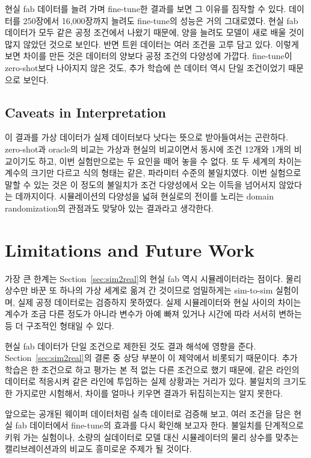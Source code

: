 \documentclass[10pt,twocolumn,a4paper]{article}
\begin{document}
현실 fab 데이터를 늘려 가며 fine-tune한 결과를 보면 그 이유를 짐작할 수 있다. 데이터를
250장에서 16,000장까지 늘려도 fine-tune의 성능은 거의 그대로였다. 현실 fab 데이터가 모두 같은
공정 조건에서 나왔기 때문에, 양을 늘려도 모델이 새로 배울 것이 많지 않았던 것으로 보인다.
반면 트윈 데이터는 여러 조건을 고루 담고 있다. 이렇게 보면 차이를 만든 것은 데이터의 양보다
공정 조건의 다양성에 가깝다. fine-tune이 zero-shot보다 나아지지 않은 것도,
추가 학습에 쓴 데이터 역시 단일 조건이었기 때문으로 보인다.

\subsection{Caveats in Interpretation}

이 결과를 가상 데이터가 실제 데이터보다 낫다는 뜻으로 받아들여서는 곤란하다. zero-shot과
oracle의 비교는 가상과 현실의 비교이면서 동시에 조건 12개와 1개의 비교이기도 하고, 이번
실험만으로는 두 요인을 떼어 놓을 수 없다. 또 두 세계의 차이는 계수의 크기만 다르고 식의
형태는 같은, 파라미터 수준의 불일치였다. 이번 실험으로 말할 수 있는 것은 이 정도의
불일치가 조건 다양성에서 오는 이득을 넘어서지 않았다는 데까지이다. 시뮬레이션의 다양성을
넓혀 현실로의 전이를 노리는 domain randomization\cite{tobin}의 관점과도 맞닿아 있는
결과라고 생각한다.

\section{Limitations and Future Work}

가장 큰 한계는 Section~\ref{sec:sim2real}의 현실 fab 역시 시뮬레이터라는 점이다. 물리 상수만 바꾼 또 하나의 가상
세계로 옮겨 간 것이므로 엄밀하게는 sim-to-sim 실험이며, 실제 공정 데이터로는 검증하지
못하였다. 실제 시뮬레이터와 현실 사이의 차이는 계수가 조금 다른 정도가 아니라 변수가 아예
빠져 있거나 시간에 따라 서서히 변하는 등 더 구조적인 형태일 수 있다.

현실 fab 데이터가 단일 조건으로 제한된 것도 결과 해석에 영향을 준다. Section~\ref{sec:sim2real}의 결론 중 상당 부분이 이 제약에서 비롯되기 때문이다. 추가 학습은 한 조건으로
하고 평가는 본 적 없는 다른 조건으로 했기 때문에, 같은 라인의 데이터로 적응시켜 같은 라인에
투입하는 실제 상황과는 거리가 있다. 불일치의 크기도 한 가지로만 시험해서, 차이를 얼마나
키우면 결과가 뒤집히는지는 알지 못한다.

앞으로는 공개된 웨이퍼 데이터처럼 실측 데이터로 검증해 보고, 여러 조건을 담은 현실 fab
데이터에서 fine-tune의 효과를 다시 확인해 보고자 한다. 불일치를 단계적으로 키워 가는 실험이나,
소량의 실데이터로 모델 대신 시뮬레이터의 물리 상수를 맞추는 캘리브레이션과의 비교도 흥미로운
주제가 될 것이다.
\end{document}
